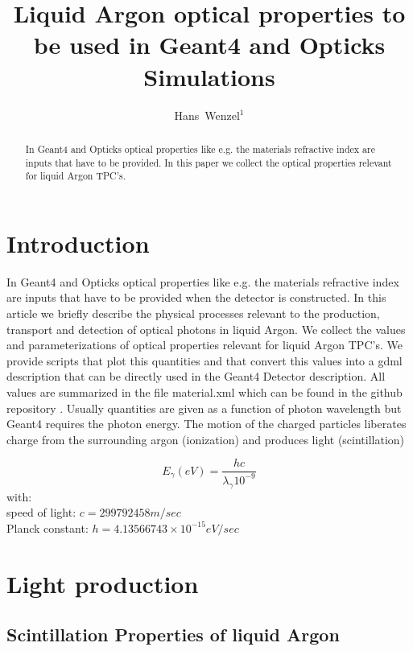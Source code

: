 \documentclass[a4paper]{jpconf}
\begin{document}
\title{Liquid Argon optical properties to be used in Geant4 and Opticks Simulations}

\author{ Hans~Wenzel$^1$}

\address{ $^1$~Fermilab PO Box 500, Batavia, IL 60510,
USA}


\begin{abstract}
  In Geant4 and Opticks optical properties like e.g. the materials refractive
  index are inputs that have to be provided. In this paper we collect the
  optical properties relevant for liquid Argon TPC's.   
\end{abstract}
\section{Introduction}
  In Geant4 and Opticks optical properties like e.g. the materials refractive
  index are inputs that have to be provided when the detector is constructed. In this article we briefly
  describe the physical processes relevant to the production, transport and detection of optical photons in liquid Argon.
  We collect the
  values and parameterizations of optical properties relevant for liquid Argon TPC's. We provide scripts that plot this quantities and that convert this values
  into a gdml description that can be directly used in the Geant4 Detector description.
  All values are summarized in the file material.xml which can be found in the github repository \cite{ref:scripts}.
  Usually quantities are given as a function of photon wavelength but Geant4 requires the photon energy.
  The motion of the charged particles liberates
charge from the surrounding argon (ionization) and
produces light (scintillation)



\begin{equation}
  E_{\gamma}(eV) = \frac{h  c}{\lambda_{\gamma}  10^{-9}}
  \label{equ:equation1}
\end{equation}
\noindent
    with:\\
  speed of light: $c = 299792458 m/sec$\\
  Planck constant: $h = 4.13566743\times10^{-15} eV/sec$\\
  \clearpage
  \section{Light production}  
  \subsection{Scintillation Properties of liquid Argon}
\end{document}

